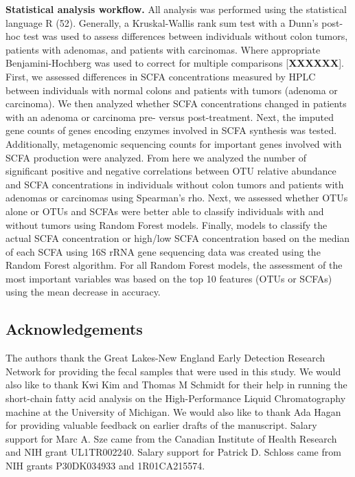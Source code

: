 \documentclass[11pt,]{article}
\begin{document}
\textbf{Statistical analysis workflow.} All analysis was performed using
the statistical language R (52). Generally, a Kruskal-Wallis rank sum
test with a Dunn's post-hoc test was used to assess differences between
individuals without colon tumors, patients with adenomas, and patients
with carcinomas. Where appropriate Benjamini-Hochberg was used to
correct for multiple comparisons {[}\textbf{XXXXXX}{]}. First, we
assessed differences in SCFA concentrations measured by HPLC between
individuals with normal colons and patients with tumors (adenoma or
carcinoma). We then analyzed whether SCFA concentrations changed in
patients with an adenoma or carcinoma pre- versus post-treatment. Next,
the imputed gene counts of genes encoding enzymes involved in SCFA
synthesis was tested. Additionally, metagenomic sequencing counts for
important genes involved with SCFA production were analyzed. From here
we analyzed the number of significant positive and negative correlations
between OTU relative abundance and SCFA concentrations in individuals
without colon tumors and patients with adenomas or carcinomas using
Spearman's rho. Next, we assessed whether OTUs alone or OTUs and SCFAs
were better able to classify individuals with and without tumors using
Random Forest models. Finally, models to classify the actual SCFA
concentration or high/low SCFA concentration based on the median of each
SCFA using 16S rRNA gene sequencing data was created using the Random
Forest algorithm. For all Random Forest models, the assessment of the
most important variables was based on the top 10 features (OTUs or
SCFAs) using the mean decrease in accuracy.

\newpage

\hypertarget{acknowledgements}{%
\subsection{Acknowledgements}\label{acknowledgements}}

The authors thank the Great Lakes-New England Early Detection Research
Network for providing the fecal samples that were used in this study. We
would also like to thank Kwi Kim and Thomas M Schmidt for their help in
running the short-chain fatty acid analysis on the High-Performance
Liquid Chromatography machine at the University of Michigan. We would
also like to thank Ada Hagan for providing valuable feedback on earlier
drafts of the manuscript. Salary support for Marc A. Sze came from the
Canadian Institute of Health Research and NIH grant UL1TR002240. Salary
support for Patrick D. Schloss came from NIH grants P30DK034933 and
1R01CA215574.
\end{document}
